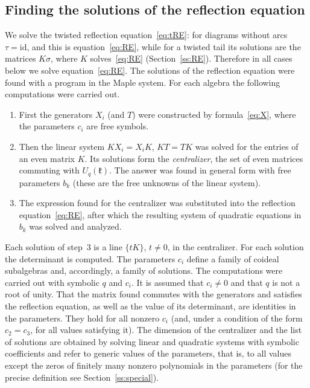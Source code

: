 \documentclass[12pt,a4paper]{article}
\newcommand{\kk}{\mathfrak{k}}
\newcommand{\Uq}{U_q}
\begin{document}
\subsection{Finding the solutions of the reflection equation}
We solve the twisted reflection equation~\eqref{eq:tRE}: for diagrams without arcs $\tau=\mathrm{id}$, and this is
equation~\eqref{eq:RE}, while for a twisted tail its solutions are the matrices $K\sigma$, where $K$ solves~\eqref{eq:RE}
(Section~\ref{ss:RE}). Therefore in all cases below we solve equation~\eqref{eq:RE}.
The solutions of the reflection equation were found with a program in the Maple system. For each algebra the following computations were carried out.
\begin{enumerate}
\item First the generators $X_i$ (and $T$) were constructed by formula~\eqref{eq:X}, where the parameters $c_i$ are free symbols.
\item Then the linear system $KX_i=X_iK$, $KT=TK$ was solved for the entries of an even matrix $K$. Its solutions form the
\emph{centralizer}, the set of even matrices commuting with $\Uq(\kk)$. The answer was found in general form with free parameters $b_k$ (these are the free unknowns of the linear system).
\item The expression found for the centralizer was substituted into the reflection equation~\eqref{eq:RE}, after which the resulting system of quadratic equations
in $b_k$ was solved and analyzed.
\end{enumerate}
Each solution of step~3 is a line $\{tK\}$, $t\neq0$, in the centralizer. For each solution the determinant is computed. The parameters $c_i$ define a family of coideal subalgebras and, accordingly, a family of solutions. The computations were carried out with symbolic $q$ and $c_i$. It is assumed that $c_i\neq0$ and that $q$ is not a root of unity. That the matrix found commutes with the generators and satisfies the reflection equation, as well as the value of its determinant, are identities in the parameters. They hold for all nonzero $c_i$ (and, under a condition of the form $c_2=c_3$, for all values satisfying it). The dimension of the centralizer and the list of solutions are obtained by solving linear and quadratic systems with symbolic coefficients and refer to generic values of the parameters, that is, to all values except the zeros of finitely many nonzero polynomials in the parameters (for the precise definition see Section~\ref{ss:special}).
\end{document}

